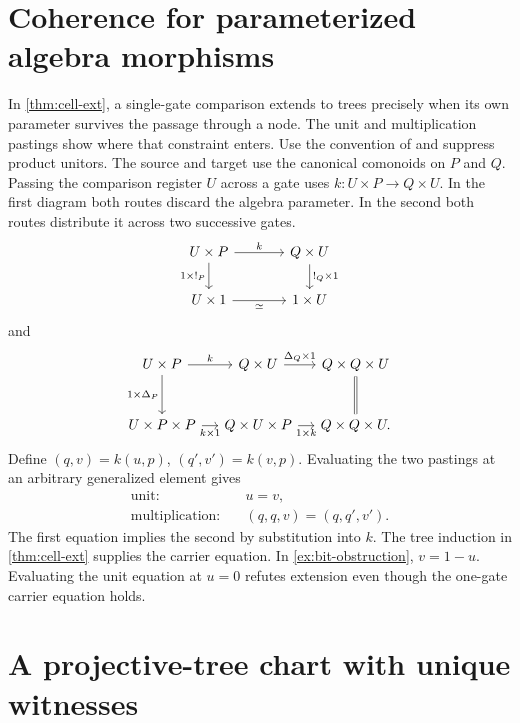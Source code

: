 \documentclass[11pt,a4paper]{article}
\theoremstyle{definition}
\theoremstyle{remark}\newaliascnt{remark}{theorem}
\numberwithin{equation}{section}
\begin{document}
\section{Coherence for parameterized algebra morphisms}\label{app:pasting}
In \cref{thm:cell-ext}, a single-gate comparison extends to trees precisely when its own parameter survives the passage through a node. The unit and multiplication pastings show where that constraint enters. Use the convention of \cite[Definitions F.2, F.3 and G.1]{cdl} and suppress product unitors. The source and target use the canonical comonoids on $P$ and $Q$. Passing the comparison register $U$ across a gate uses $k:U\times P\to Q\times U$. In the first diagram both routes discard the algebra parameter. In the second both routes distribute it across two successive gates.
\[
\begin{tikzcd}[column sep=large]
 U\times P\arrow[r,"k"]\arrow[d,"{1\times !_P}"']&
 Q\times U\arrow[d,"{!_Q\times1}"]\\
 U\times1\arrow[r,"\simeq"']&1\times U
\end{tikzcd}
\]
and
\[
\begin{tikzcd}[row sep=large,column sep=small]
 U\times P\arrow[r,"k"]\arrow[d,"{1\times\Delta_P}"']&
 Q\times U\arrow[r,"{\Delta_Q\times1}"]&Q\times Q\times U\arrow[d,equal]\\
 U\times P\times P\arrow[r,"{k\times1}"']&
 Q\times U\times P\arrow[r,"{1\times k}"']&Q\times Q\times U .
\end{tikzcd}
\]
Define \((q,v)=k(u,p)\), \((q',v')=k(v,p)\). Evaluating the two pastings at an arbitrary generalized element gives
\[
\begin{aligned}
 \text{unit:}\quad &u=v,\\
 \text{multiplication:}\quad &(q,q,v)=(q,q',v').
\end{aligned}
\]
The first equation implies the second by substitution into \(k\). The tree induction in \cref{thm:cell-ext} supplies the carrier equation. In \cref{ex:bit-obstruction}, \(v=1-u\). Evaluating the unit equation at \(u=0\) refutes extension even though the one-gate carrier equation holds.

\section{A projective-tree chart with unique witnesses}\label{app:treechart}
\end{document}
